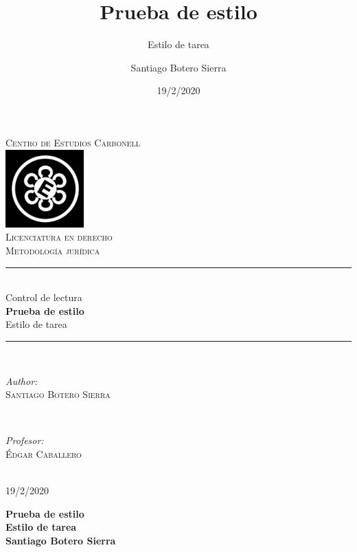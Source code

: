\documentclass[
              spanish,
                ]{article}
\title{Prueba de estilo}
\subtitle{Estilo de tarea}
\author{Santiago Botero Sierra}
\date{19/2/2020}
\begin{document}
                    \begin{titlepage}
            \newcommand{\HRule}{\rule{\linewidth}{0.5mm}}
            \center
            \textsc{\LARGE Centro de Estudios Carbonell}\\[0.5cm]
            \includegraphics[height=3cm]{CEC.jpg}\\[1cm]
            \textsc{\Large Licenciatura en derecho}\\
            \textsc{\large Metodología jurídica}\\[0.5cm]
            \HRule \\[0.4cm]
            Control de lectura\\[0.2cm]
            { \huge \bfseries Prueba de estilo}\\[0.2cm]
            {\large Estilo de tarea}\\[0.4cm]
            \HRule \\[1cm]
                            \begin{minipage}{0.4\textwidth}
                \begin{flushleft} \large
                \emph{Author:}\\
                \textsc{Santiago Botero Sierra}
                \end{flushleft}
                \end{minipage}\\[1cm]
                                        \begin{minipage}{0.4\textwidth}
                \begin{flushright} \large
                \emph{Profesor:}\\
                \textsc{Édgar Caballero}
                \end{flushright}
                \end{minipage}\\[1cm]
                        {\large 19/2/2020}
            \vfill
            \end{titlepage}
            \begin{flushright}
                \textbf{Prueba de estilo}\\
                \textbf{Estilo de tarea}\\
                \textbf{Santiago Botero Sierra}
            \end{flushright}
                        
\end{document}
